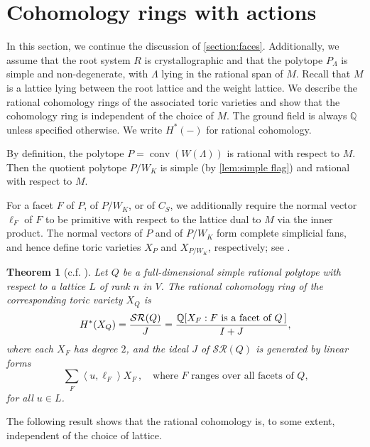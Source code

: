 \documentclass{amsart}
\theoremstyle{plain} \numberwithin{equation}{section}
\newtheorem{theorem}{Theorem}[section]
\theoremstyle{definition}
\newcommand{\Q}{\mathbb{Q}}
\newcommand{\ip}[1]{\left\langle #1 \right\rangle}
\DeclareMathOperator{\conv}{conv}
\begin{document}
\section{Cohomology rings with actions}\label{section:variety coho}

In this section, we continue the discussion of \cref{section:faces}. Additionally, we assume that the root system $R$ is crystallographic and that the polytope $P_{\Lambda}$ is simple and non-degenerate, with $\Lambda$ lying in the rational span of $M$.
Recall that $M$ is a lattice lying between the root lattice and the weight lattice. We describe the rational cohomology rings of the associated toric varieties and show that the cohomology ring is independent of the choice of $M$.
The ground field is always $\Q$ unless specified otherwise.
We write $H^*(-)$ for rational cohomology.



 By definition, the polytope $P=\conv\left(W(\Lambda)\right)$ is rational with respect to $M$. Then the quotient polytope $P/W_K$ is simple (by \cref{lem:simple flag}) and rational with respect to $M$.


 For a facet $F$ of $P$, of $P/W_K$, or of $C_S$, we additionally require the normal vector $\ell_F$ of $F$ to be primitive with respect to the lattice dual to $M$ via the inner product.
 The normal vectors of $P$ and of $P/W_K$ form complete simplicial fans, and hence define toric varieties $X_P$ and $X_{P/W_K}$, respectively; see \cite[\S 5]{danilovGEOMETRYTORICVARIETIES1978}.



\begin{theorem}[c.f. {\cite[\S 10.9]{danilovGEOMETRYTORICVARIETIES1978}}]\label{thm:danilov cohomology}
Let $Q$ be a full-dimensional simple rational polytope with respect to a lattice $L$ of rank $n$ in $V$. The rational cohomology ring of the corresponding toric variety $X_Q$ is 
\begin{align*}
  H^*(X_Q)=\frac{\mathcal{SR}(Q)}{J}=\frac{\Q[X_{F}: \mbox{$F$ is a facet of $Q$\,}]}{I+J},
\end{align*}
where each $X_F$ has degree $2$, and the ideal $J$ of $\mathcal{SR}(Q)$ is generated by linear forms
  $$\sum_{F}\ip{u,\ell_F}X_F\,,\quad\mbox 
  {where $F$ ranges over all facets of $Q$,}$$
for all $u\in L$.
\end{theorem}

The following result shows that the rational cohomology is, to some extent, independent of the choice of lattice. 
\end{document}

